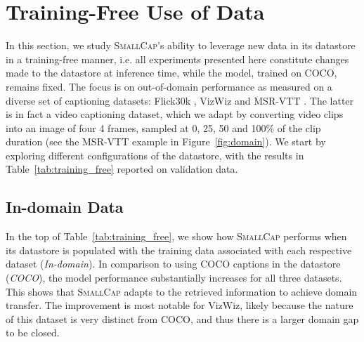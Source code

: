 \documentclass[10pt,twocolumn,letterpaper]{article}
\newcommand{\model}{\textsc{SmallCap}\xspace}
\begin{document}
\section{Training-Free Use of Data}
\label{sec:training}
In this section, we study \model's ability to leverage new data in its datastore in a training-free manner, i.e. all experiments presented here constitute changes made to the datastore at inference time, while the model, trained on COCO, remains fixed. The focus is on out-of-domain performance as measured on a diverse set of captioning datasets: Flick30k \cite{young2014image}, VizWiz \cite{gurari2020captioning} and MSR-VTT \cite{xu2016msr}. The latter is in fact a video captioning dataset, which we adapt by converting video clips into an image of four 4 frames, sampled at 0, 25, 50 and 100\% of the clip duration (see the MSR-VTT example in Figure~\ref{fig:domain}). %
We start by exploring different configurations of the datastore, with the results in Table~\ref{tab:training_free} reported on validation data.

\subsection{In-domain Data}

In the top of Table~\ref{tab:training_free}, we show how \textsc{SmallCap} performs when its datastore is populated with the training data associated with each respective dataset (\textit{In-domain}). In comparison to using COCO captions in the datastore (\textit{COCO}), the model performance substantially increases for all three datasets. This shows that \textsc{SmallCap} adapts to the retrieved information to achieve domain transfer. The improvement is most notable for VizWiz, likely because the nature of this dataset is very distinct from COCO, and thus there is a larger domain gap to be closed. %
\end{document}
